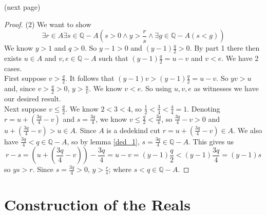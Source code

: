 \documentclass{report}
\begin{document}
\noindent(next page)\newpage
\begin{proof}(2)
We want to show
\begin{equation*}
\exists r\in A\exists s\in\mathbb Q-A(s>0\land y>\frac rs\land\exists g\in\mathbb Q-A(s<g))
\end{equation*}
We know $y>1$ and $q>0$. So $y-1>0$ and $(y-1)\frac q2>0$. By part 1 there then exists $u\in A$ and $v,e\in\mathbb Q-A$ such that 
$(y-1)\frac q2=u-v$ and $v<e$. We have 2 cases.\\
\indent First suppose $v>\frac q2$. It follows that $(y-1)v>(y-1)\frac q2=u-v$. So 
$yv>u$ and, since $v>\frac q2>0$, $y>\frac uv$. We know $v<e$. So using $u,v,e$ as witnesses we have our desired result.\\
\indent Next suppose $v\leq\frac q2$. We know $2<3<4$, so $\frac12<\frac34<\frac44=1$. Denoting $r=u+(\frac{3q}4-v)$ and $s=\frac{3q}4$, we know $v\leq\frac q2<\frac{3q}4$, so 
$\frac{3q}4-v>0$ and $u+(\frac{3q}4-v)>u\in A$. Since $A$ is a dedekind cut $r=u+(\frac{3q}4-v)\in A$.
We also have $\frac{3q}4<q\in\mathbb Q-A$, so by lemma \ref{ded_1}, $s=\frac{3q}4\in\mathbb Q-A$.
This gives us
\begin{equation*}
r-s=(u+(\frac{3q}4-v))-\frac{3q}4=u-v=(y-1)\frac q2<(y-1)\frac{3q}4=(y-1)s
\end{equation*}
so $ys>r$. Since $s=\frac{3q}4>0$, $y>\frac rs$; where $s<q\in\mathbb Q-A$.
\end{proof}
\newpage

\section{Construction of the Reals}
\end{document}
